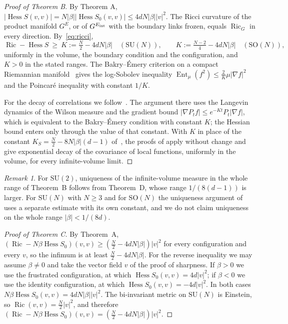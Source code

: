 \documentclass[11pt]{amsart}
\theoremstyle{definition}
\theoremstyle{remark}
\newtheorem{remark}[theorem]{Remark}
\newcommand{\SU}{\mathrm{SU}}
\newcommand{\SO}{\mathrm{SO}}
\newcommand{\Hess}{\operatorname{Hess}}
\newcommand{\Ric}{\operatorname{Ric}}
\begin{document}
\begin{proof}[Proof of Theorem B]
By Theorem A, $|\Hess S(v,v)|=N|\beta||\Hess S_0(v,v)|\le4dN|\beta||v|^2$. The
Ricci curvature of the product manifold $G^E$, or of $G^{E_{\rm int}}$ with the
boundary links frozen, equals $\Ric_G$ in every direction. By~\eqref{eq:ricci},
\[
\Ric-\Hess S\ \ge\ K:=\tfrac N2-4dN|\beta|\quad(\SU(N)),\qquad
K:=\tfrac{N-2}4-4dN|\beta|\quad(\SO(N)),
\]
uniformly in the volume, the boundary condition and the configuration, and
$K>0$ in the stated ranges. The Bakry--\'Emery criterion on a compact
Riemannian manifold~\cite[Cor.~5.7.2]{BGL14} gives the log-Sobolev inequality
$\operatorname{Ent}_\mu(f^2)\le\frac2K\mu|\nabla f|^2$ and the Poincar\'e
inequality with constant $1/K$.

For the decay of correlations we follow~\cite[\S4]{SZZ23}. The argument there
uses the Langevin dynamics of the Wilson measure and the gradient bound
$|\nabla P_tf|\le e^{-Kt}P_t|\nabla f|$, which is equivalent to the
Bakry--\'Emery condition with constant $K$; the Hessian bound enters only
through the value of that constant. With $K$ in place of the constant
$K_S=\frac N2-8N|\beta|(d-1)$ of~\cite{SZZ23}, the proofs of
\cite[Cor.~4.11 and Rem.~4.12]{SZZ23} apply without change and give exponential
decay of the covariance of local functions, uniformly in the volume, for every
infinite-volume limit.
\end{proof}

\begin{remark}
For $\SU(2)$, uniqueness of the infinite-volume measure in the whole range of
Theorem~B follows from Theorem~D, whose range $1/(8(d-1))$ is larger. For
$\SU(N)$ with $N\ge3$ and for $\SO(N)$ the uniqueness argument of
\cite[\S5]{SZZ23} uses a separate estimate with its own constant, and we do not
claim uniqueness on the whole range $|\beta|<1/(8d)$.
\end{remark}

\begin{proof}[Proof of Theorem C]
By Theorem~A, $(\Ric-N\beta\Hess S_0)(v,v)\ge(\frac N2-4dN|\beta|)|v|^2$ for
every configuration and every $v$, so the infimum is at least
$\frac N2-4dN|\beta|$. For the reverse inequality we may assume $\beta\ne0$ and
take the vector field $v$ of the proof of sharpness. If $\beta>0$ we use the
frustrated configuration, at which $\Hess S_0(v,v)=4d|v|^2$; if $\beta<0$ we use
the identity configuration, at which $\Hess S_0(v,v)=-4d|v|^2$. In both cases
$N\beta\Hess S_0(v,v)=4dN|\beta||v|^2$. The bi-invariant metric on $\SU(N)$ is
Einstein, so $\Ric(v,v)=\frac N2|v|^2$, and therefore
$(\Ric-N\beta\Hess S_0)(v,v)=(\frac N2-4dN|\beta|)|v|^2$.
\end{proof}
\end{document}
